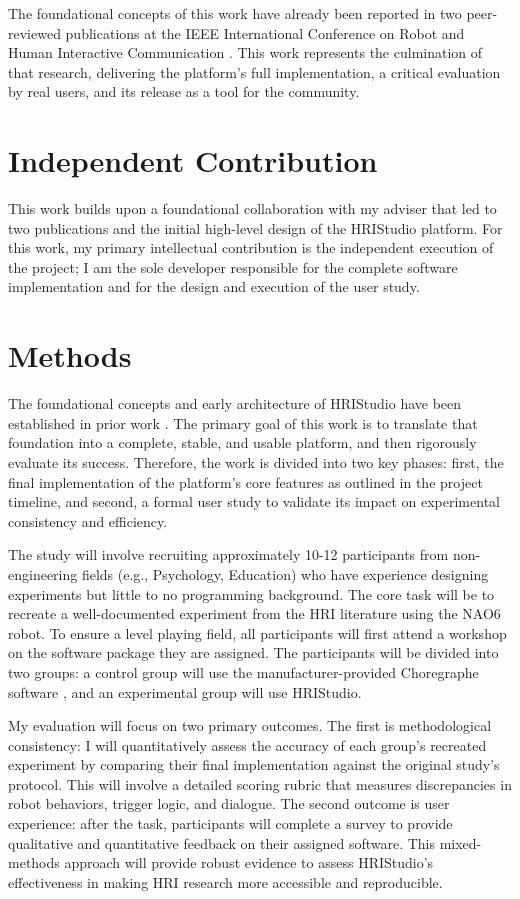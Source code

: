 \documentclass[numbib]{buthesis_p}  %
\begin{document}
The foundational concepts of this work have already been reported in two peer-reviewed publications at the IEEE International Conference on Robot and Human Interactive Communication \cite{OConnor2024, OConnor2025}. This work represents the culmination of that research, delivering the platform's full implementation, a critical evaluation by real users, and its release as a tool for the community.

\section{Independent Contribution}

This work builds upon a foundational collaboration with my adviser that led to two publications and the initial high-level design of the HRIStudio platform. For this work, my primary intellectual contribution is the independent execution of the project; I am the sole developer responsible for the complete software implementation and for the design and execution of the user study.

\section{Methods}

The foundational concepts and early architecture of HRIStudio have been established in prior work \cite{OConnor2024, OConnor2025}. The primary goal of this work is to translate that foundation into a complete, stable, and usable platform, and then rigorously evaluate its success. Therefore, the work is divided into two key phases: first, the final implementation of the platform's core features as outlined in the project timeline, and second, a formal user study to validate its impact on experimental consistency and efficiency.

The study will involve recruiting approximately 10-12 participants from non-engineering fields (e.g., Psychology, Education) who have experience designing experiments but little to no programming background. The core task will be to recreate a well-documented experiment from the HRI literature using the NAO6 robot. To ensure a level playing field, all participants will first attend a workshop on the software package they are assigned. The participants will be divided into two groups: a control group will use the manufacturer-provided Choregraphe software \cite{Pot2009}, and an experimental group will use HRIStudio.

My evaluation will focus on two primary outcomes. The first is methodological consistency: I will quantitatively assess the accuracy of each group's recreated experiment by comparing their final implementation against the original study's protocol. This will involve a detailed scoring rubric that measures discrepancies in robot behaviors, trigger logic, and dialogue. The second outcome is user experience: after the task, participants will complete a survey to provide qualitative and quantitative feedback on their assigned software. This mixed-methods approach will provide robust evidence to assess HRIStudio's effectiveness in making HRI research more accessible and reproducible.
\end{document}
